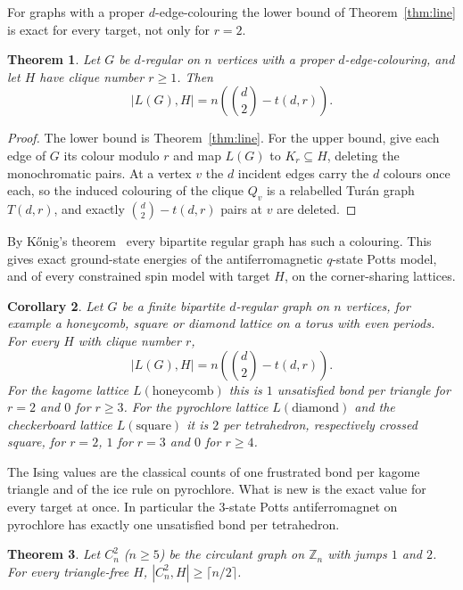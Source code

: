 \documentclass{article}
\newtheorem{theorem}{Theorem}[section]
\newtheorem{corollary}[theorem]{Corollary}
\theoremstyle{definition}
\begin{document}
For graphs with a proper $d$-edge-colouring the lower bound of
Theorem~\ref{thm:line} is exact for every target, not only for $r=2$.

\begin{theorem}
\label{thm:line_exact}
Let $G$ be $d$-regular on $n$ vertices with a proper $d$-edge-colouring, and let $H$
have clique number $r\ge1$.  Then
\[
  |L(G),H| = n\left(\binom d2-t(d,r)\right).
\]
\end{theorem}

\begin{proof}
The lower bound is Theorem~\ref{thm:line}.  For the upper bound, give each edge of
$G$ its colour modulo $r$ and map $L(G)$ to $K_r\subseteq H$, deleting the
monochromatic pairs.  At a vertex $v$ the $d$ incident edges carry the $d$
colours once each, so the induced colouring of the clique $Q_v$ is a relabelled
Tur\'an graph $T(d,r)$, and exactly $\binom d2-t(d,r)$ pairs at $v$ are deleted.
\end{proof}

By K\H{o}nig's theorem~\cite{konig1916} every bipartite regular graph has such a
colouring.  This gives exact ground-state energies of the antiferromagnetic
$q$-state Potts model, and of every constrained spin model with target $H$, on
the corner-sharing lattices.

\begin{corollary}
\label{cor:lattices}
Let $G$ be a finite bipartite $d$-regular graph on $n$ vertices, for example a
honeycomb, square or diamond lattice on a torus with even periods.  For every
$H$ with clique number $r$,
\[
  |L(G),H| = n\left(\binom d2-t(d,r)\right).
\]
For the kagome lattice $L(\text{honeycomb})$ this is $1$ unsatisfied bond per
triangle for $r=2$ and $0$ for $r\ge3$.  For the pyrochlore lattice
$L(\text{diamond})$ and the checkerboard lattice $L(\text{square})$ it is $2$ per
tetrahedron, respectively crossed square, for $r=2$, $1$ for $r=3$ and $0$ for
$r\ge4$.
\end{corollary}

The Ising values are the classical counts of one frustrated bond per kagome
triangle and of the ice rule on pyrochlore.  What is new is the exact value for
every target at once.  In particular the $3$-state Potts antiferromagnet on
pyrochlore has exactly one unsatisfied bond per tetrahedron.

\begin{theorem}
\label{thm:square_cycle}
Let $C_n^2$ ($n\ge5$) be the circulant graph on $\mathbb Z_n$ with jumps $1$ and
$2$.  For every triangle-free $H$, $|C_n^2,H|\ge\lceil n/2\rceil$.
\end{theorem}
\end{document}
